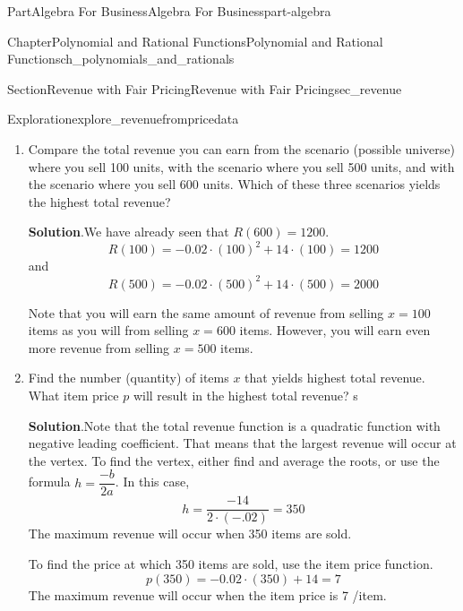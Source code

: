 \documentclass[oneside,10pt,]{tufte-book}
\newcommand{\blocktitlefont}{\relax}
\numberwithin{equation}{chapter}
\begin{document}
\begin{partptx}{Part}{Algebra For Business}{}{Algebra For Business}{}{}{part-algebra}
\begin{chapterptx}{Chapter}{Polynomial and Rational Functions}{}{Polynomial and Rational Functions}{}{}{ch_polynomials_and_rationals}
\begin{sectionptx}{Section}{Revenue with Fair Pricing}{}{Revenue with Fair Pricing}{}{}{sec_revenue}
\begin{exploration}{Exploration}{}{explore_revenuefrompricedata}
\begin{enumerate}[font=\bfseries,label=(\alph*),ref=\alph*]
\par
In this scenario, the total revenue will be \(600\) items times \(2\) dollars, which equals \textdollar{}\(1200\) of total revenue.%
\par
Equivalently, \(R(600) = -0.02\cdot (600)^2 + 14 \cdot (600) = \dots = 1200\) dollars.%
\item{}Compare the total revenue you can earn from the scenario (possible universe) where you sell 100 units, with the scenario where you sell 500 units, and with the scenario where you sell 600 units. Which of these three scenarios yields the highest total revenue?%
\par\smallskip%
\noindent\textbf{\blocktitlefont Solution}.\hypertarget{explore_revenuefrompricedata-5-2}{}\quad{}We have already seen that \(R(600) = 1200\).%
\begin{equation*}
R(100) = -0.02\cdot (100)^2 + 14 \cdot (100) = 1200
\end{equation*}
and%
\begin{equation*}
R(500) = -0.02\cdot (500)^2 + 14 \cdot (500) = 2000
\end{equation*}
%
\par
Note that you will earn the same amount of revenue from selling \(x=100\) items as you will from selling \(x=600\) items.  However, you will earn even more revenue from selling \(x=500\) items.%
\item{}Find the number (quantity) of items \(x\) that yields highest total revenue. What item price \(p\) will result in the highest total revenue? s%
\par\smallskip%
\noindent\textbf{\blocktitlefont Solution}.\hypertarget{explore_revenuefrompricedata-6-2}{}\quad{}Note that the total revenue function is a quadratic function with negative leading coefficient.  That means that the largest revenue will occur at the vertex.  To find the vertex, either find and average the roots, or use the formula \(h = \dfrac{-b}{2a}\).  In this case,%
\begin{equation*}
h = \dfrac{-14}{2\cdot(-.02)} = 350
\end{equation*}
The maximum revenue will occur when 350 items are sold.%
\par
To find the price at which 350 items are sold, use the item price function.%
\begin{equation*}
p(350) = -0.02\cdot (350) + 14 = 7 
\end{equation*}
The maximum revenue will occur when the item price is 7 \textdollar{}\slash{}item.%
\begin{equation*}

\end{equation*}
\end{enumerate}
\end{exploration}
\end{sectionptx}
\end{chapterptx}
\end{partptx}
\end{document}
